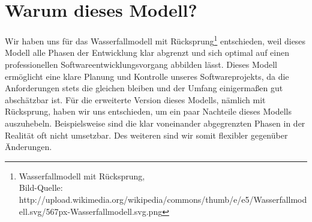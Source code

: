 \section{Warum dieses Modell?}
Wir haben uns für das Wasserfallmodell mit Rücksprung\footnote{Wasserfallmodell mit Rücksprung, \\ Bild-Quelle: http://upload.wikimedia.org/wikipedia/commons/thumb/e/e5/Wasserfallmodell.svg/567px-Wasserfallmodell.svg.png} entschieden, weil dieses Modell alle Phasen der 
Entwicklung klar abgrenzt und sich optimal auf einen professionellen Softwareentwicklungsvorgang
abbilden lässt. Dieses Modell ermöglicht eine klare Planung und Kontrolle unseres Softwareprojekts,
da die Anforderungen stets die gleichen bleiben und der Umfang einigermaßen gut abschätzbar ist.
Für die erweiterte Version dieses Modells, nämlich mit Rücksprung, haben wir uns entschieden, um ein 
paar Nachteile dieses Modells auszuhebeln. Beispielsweise sind die klar voneinander abgegrenzten Phasen
in der Realität oft nicht umsetzbar. Des weiteren sind wir somit flexibler gegenüber Änderungen.


